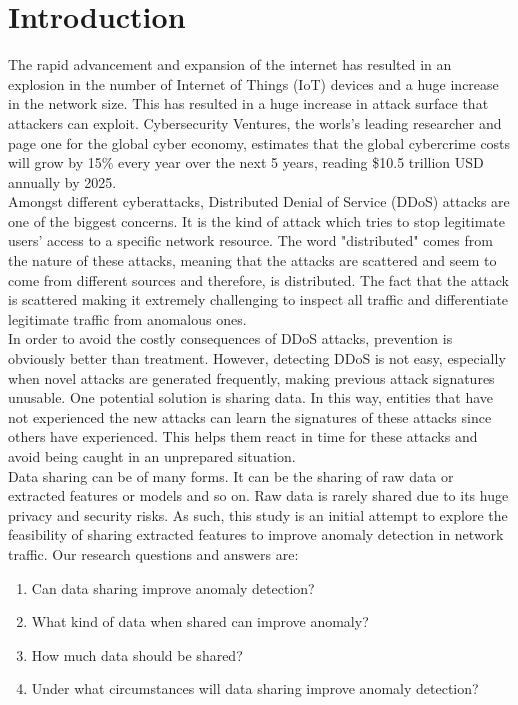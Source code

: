 \section{Introduction}
\label{sec:intro}
\begin{intro}

The rapid advancement and expansion of the internet has resulted in 
an explosion in the number of Internet of Things (IoT) devices and a huge increase in the network size. This has resulted in a huge increase in attack surface that attackers can exploit. Cybersecurity Ventures, the worls's leading researcher and page one for the global cyber economy, estimates that the global cybercrime costs will grow by 15\% every year over the next 5 years, reading \$10.5 trillion USD annually by 2025. \\

Amongst different cyberattacks, Distributed Denial of Service (DDoS) attacks are one of the biggest concerns. It is the kind of attack which tries to stop legitimate users' access to a specific network resource. The word "distributed" comes from the nature of these attacks, meaning that the attacks are scattered and seem to come from different sources and therefore, is distributed. The fact that the attack is scattered making it extremely challenging to inspect all traffic and differentiate legitimate traffic from anomalous ones.\\

In order to avoid the costly consequences of DDoS attacks, prevention is obviously better than treatment. However, detecting DDoS is not easy, especially when novel attacks are generated frequently, making previous attack signatures unusable. One potential solution is sharing data. In this way, entities that have not experienced the new attacks can learn the  signatures of these attacks since others have experienced. This helps them react in time for these attacks and avoid being caught in an unprepared situation.\\

Data sharing can be of many forms. It can be the sharing of raw data or extracted features or models and so on. Raw data is rarely shared due to its huge privacy and security risks. As such, this study is an initial attempt to explore the feasibility of sharing extracted features to improve anomaly detection in network traffic. Our research questions and answers are:
\begin{enumerate}
    \item Can data sharing improve anomaly detection?
    \item What kind of data when shared can improve anomaly?
    \item How much data should be shared?
    \item Under what circumstances will data sharing improve anomaly detection?
    
\end{enumerate}








\end{intro}
